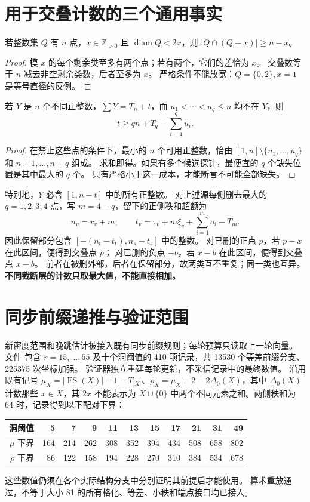 \documentclass[10pt,a4paper]{article}
\newcommand{\FS}{\operatorname{FS}}\newcommand{\Z}{\mathbb Z}\newcommand{\T}{T}
\begin{document}
\section{用于交叠计数的三个通用事实}
\begin{lemma}[严格直径条件]
若整数集 $Q$ 有 $n$ 点，$x\in\Z_{>0}$ 且 $\operatorname{diam}Q<2x$，则
$|Q\cap(Q+x)|\ge n-x$。
\end{lemma}
\begin{proof}
模 $x$ 的每个剩余类至多有两个点；若有两个，它们的差恰为 $x$。
交叠数等于 $n$ 减去非空剩余类数，后者至多为 $x$。
严格条件不能放宽：$Q=\{0,2\},x=1$ 是等号直径的反例。
\end{proof}

\begin{lemma}[缺失探针的质量成本]
若 $Y$ 是 $n$ 个不同正整数，$\sum Y=T_n+t$，而
$u_1<\cdots<u_q\le n$ 均不在 $Y$，则
\[
 t\ge qn+T_q-\sum_{i=1}^q u_i.
\]
\end{lemma}
\begin{proof}
在禁止这些点的条件下，最小的 $n$ 个可用正整数，恰由
$[1,n]\setminus\{u_1,\ldots,u_q\}$ 和 $n+1,\ldots,n+q$ 组成。
求和即得。如果有多个候选探针，最便宜的 $q$ 个缺失位置是其中最大的 $q$ 个。
只有严格小于这一成本，才能断言不可能全部缺失。
\end{proof}

特别地，$Y$ 必含 $[1,n-t]$ 中的所有正整数。
对上述源每侧删去最大的 $q=1,2,3,4$ 点，写 $m=4-q$，留下的正侧秩和超额为
\[
 n_v=r_v+m,\qquad t_v=\tau_v+m\xi_v+\sum_{i=1}^m o_i-T_m.
\]
因此保留部分包含 $[-(n_t-t_t),n_s-t_s]$ 中的整数。
对已删的正点 $p$，若 $p-x$ 在此区间，便得到交叠点 $p$；
对已删的负点 $-b$，若 $x-b$ 在此区间，便得到交叠点 $x-b$。
前者在被删外部，后者在保留部分，故两类互不重复；同一类也互异。
\textbf{不同截断层的计数只取最大值，不能直接相加。}

\section{同步前缀递推与验证范围}
新密度范围和晚跳估计被接入既有同步前缀规则；每轮预算只读取上一轮向量。
文件  包含 $r=15,\ldots,55$ 及十个洞阈值的
410 项记录，共 13530 个等差前缀分支、225375 次坐标加强。
验证器独立重建每轮更新，不采信记录中的最终数值。
沿用既有记号 $\mu_X=|\FS(X)|-1-T_{|X|}$、$\rho_X=\mu_X+2-2\Delta_0(X)$，其中 $\Delta_0(X)$ 计数那些 $x\in X$，其 $2x$ 不能表示为 $X\cup\{0\}$ 中两个不同元素之和。两侧秩和为 64 时，记录得到以下配对下界：
\begin{center}\begin{tabular}{r|rrrrrrrrrr}\toprule
洞阈值 &5&7&9&11&13&15&17&21&31&49\\\midrule
$\mu$ 下界 &164&214&262&308&352&394&434&508&658&802\\
$\rho$ 下界 &86&122&158&194&228&270&310&384&534&678\\\bottomrule
\end{tabular}\end{center}
这些数值仍须在各个实际结构分支中分别证明其前提后才能使用。
算术重放通过，不等于大小 81 的所有格化、等差、小秩和端点接口均已接入。
\end{document}
